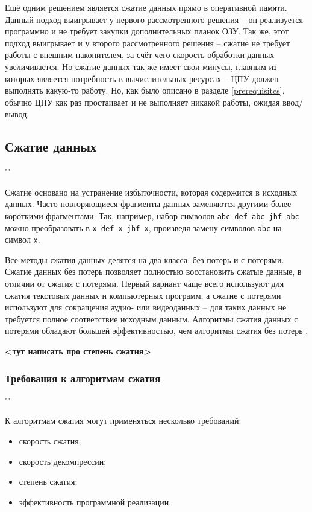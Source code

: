 Ещё одним решением является сжатие данных прямо в оперативной памяти. Данный подход выигрывает у первого рассмотренного решения -- он реализуется программно и не требует закупки дополнительных планок ОЗУ. Так же, этот подход выигрывает и у второго рассмотренного решения -- сжатие не требует работы с внешним накопителем, за счёт чего скорость обработки данных увеличивается. Но сжатие данных так же имеет свои минусы, главным из которых является потребность в вычислительных ресурсах -- ЦПУ должен выполнять какую-то работу. Но, как было описано в разделе \ref{prerequisites}, обычно ЦПУ как раз простаивает и не выполняет никакой работы, ожидая ввод/вывод.\\

\subsection{Сжатие данных}""\

Сжатие основано на устранение избыточности, которая содержится в исходных данных. Часто повторяющиеся фрагменты данных заменяются другими более короткими фрагментами. Так, например, набор символов \texttt{abc def abc jhf abc} можно преобразовать в \texttt{x def x jhf x}, произведя замену символов \texttt{abc} на символ \texttt{x}.

Все методы сжатия данных делятся на два класса: без потерь и с потерями. Сжатие данных без потерь позволяет полностью восстановить сжатые данные, в отличии от сжатия с потерями. Первый вариант чаще всего используют для сжатия текстовых данных и компьютерных программ, а сжатие с потерями используют для сокращения аудио- или видеоданных -- для таких данных не требуется полное соответствие исходным данным. Алгоритмы сжатия данных с потерями обладают большей эффективностью, чем алгоритмы сжатия без потерь \cite{lossless-compression}.

\textbf{<тут написать про степень сжатия>}\\

\subsubsection{Требования к алгоритмам сжатия}""\

К алгоритмам сжатия могут применяться несколько требований:

\begin{itemize}
	\item скорость сжатия;
	\item скорость декомпрессии;
	\item степень сжатия;
	\item эффективность программной реализации.
\end{itemize}

